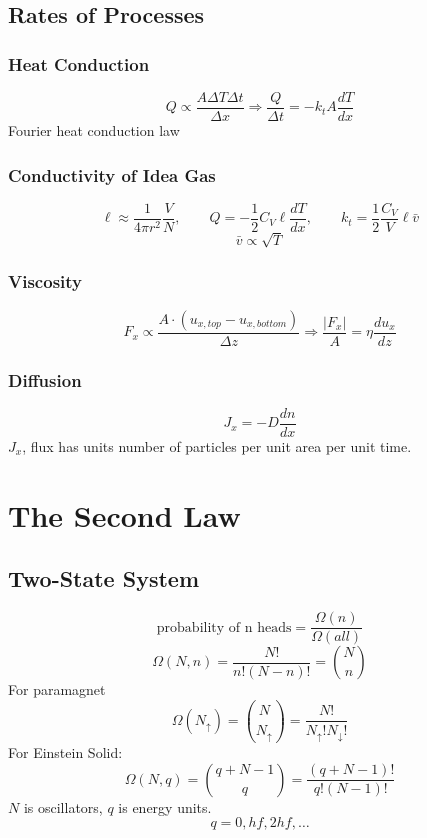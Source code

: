 \documentclass[a4paper,norsk, 10pt]{article}
\begin{document}
\subsection{Rates of Processes}
\subsubsection{Heat Conduction}
\begin{equation}
Q \propto \frac{A\Delta T\Delta t}{\Delta x} \Rightarrow \frac{Q}{\Delta t} = -k_t A \frac{dT}{dx}
\end{equation}
Fourier heat conduction law
\subsubsection{Conductivity of Idea Gas}
\begin{equation}
\ell \approx \frac{1}{4\pi r^2}\frac{V}{N},\qquad Q = -\frac{1}{2}C_V\ell \frac{dT}{dx}, \qquad k_t = \frac{1}{2}\frac{C_V}{V}\ell \bar{v}
\end{equation}
\begin{equation}
\bar{v}\propto \sqrt{T}
\end{equation}
\subsubsection{Viscosity}
\begin{equation}
F_x \propto \frac{A\cdot (u_{x,top}- u_{x,bottom})}{\Delta z} \Rightarrow \frac{|F_x|}{A} = \eta \frac{du_x}{dz}
\end{equation}
\subsubsection{Diffusion}
\begin{equation}
J_x = -D\frac{dn}{dx}
\end{equation}
$J_x$, flux has units number of particles per unit area per unit time.
\section{The Second Law}
\subsection{Two-State System}
\begin{equation}
\text{probability of n heads} = \frac{\Omega(n)}{\Omega(all)}
\end{equation}
\begin{equation}
\Omega(N,n) = \frac{N!}{n!(N-n)!} = \binom{N}{n}
\end{equation}
For paramagnet
\begin{equation}
\Omega(N_{\uparrow}) = \binom{N}{N_{\uparrow}} = \frac{N!}{N_\uparrow ! N_\downarrow !}
\end{equation}
For Einstein Solid:
\begin{equation}
\Omega(N,q) = \binom{q+N-1}{q}=\frac{(q+N-1)!}{q!(N-1)!}
\end{equation}
$N$ is oscillators, $q$ is energy units.
\begin{equation}
q = 0, hf, 2hf, \ldots
\end{equation}
\end{document}
